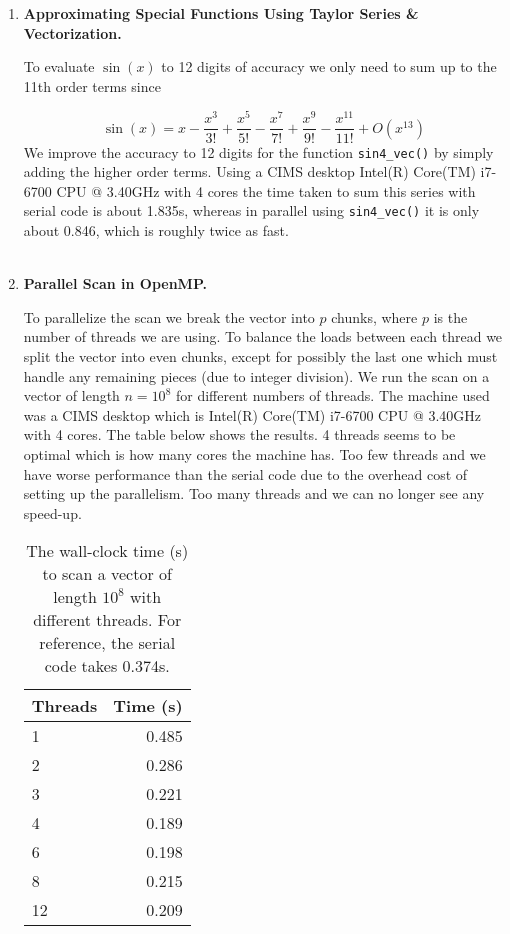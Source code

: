 \documentclass[12pt]{article}
\begin{document}
\begin{enumerate}
  \item {\bf Approximating Special Functions Using Taylor Series \& Vectorization.}




    \par To evaluate $\sin(x)$ to 12 digits of accuracy we only need to sum up to the 11th order terms since

    \[
      \sin(x) = x - \frac{x^3}{3!} + \frac{x^5}{5!} - \frac{x^7}{7!} + \frac{x^9}{9!} - \frac{x^{11}}{11!} + O(x^{13})
    \]
    We improve the accuracy to 12 digits for the function \texttt{sin4\_vec()} by simply adding the higher order terms.  Using a CIMS desktop Intel(R) Core(TM) i7-6700 CPU @ 3.40GHz with 4 cores the time taken to sum this series with serial code is about 1.835s, whereas in parallel using \texttt{sin4\_vec()} it is only about 0.846, which is roughly twice as fast.\\
\\







  \item {\bf Parallel Scan in OpenMP.}


	\par To parallelize the scan we break the vector into $p$ chunks, where $p$ is the number of threads we are using.  To balance the loads between each thread we split the vector into even chunks, except for possibly the last one which must handle any remaining pieces (due to integer division).  We run the scan on a vector of length $n = 10^8$ for different numbers of threads.  The machine used was a CIMS desktop which is Intel(R) Core(TM) i7-6700 CPU @ 3.40GHz with 4 cores.  The table below shows the results.  4 threads seems to be optimal which is how many cores the machine has.  Too few threads and we have worse performance than the serial code due to the overhead cost of setting up the parallelism.  Too many threads and we can no longer see any speed-up.

\begin{table}[H]
\centering
\begin{tabular}{| l | r |}
\hline
Threads & Time (s)\\
\hline
1 & 0.485\\
2 & 0.286\\
3 & 0.221\\
4 & 0.189\\
6 & 0.198\\
8 & 0.215\\
12 & 0.209\\
\hline
\end{tabular}
\caption{The wall-clock time (s) to scan a vector of length $10^8$ with different threads.  For reference, the serial code takes 0.374s.
}
\label{table:timings}
\end{table}



\end{enumerate}
\end{document}
